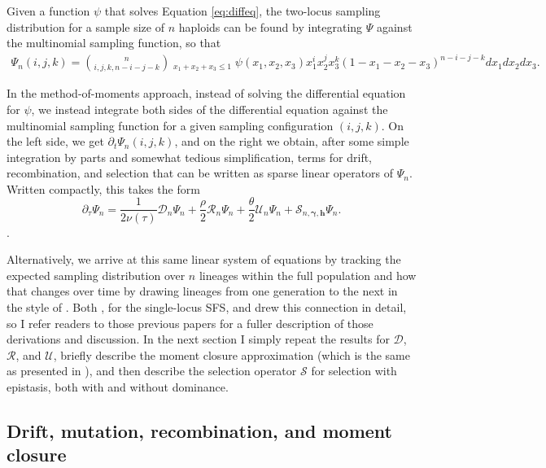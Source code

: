 \documentclass[]{article}
\begin{document}
Given a function \(\psi\) that solves Equation \ref{eq:diffeq}, the two-locus
sampling distribution for a sample size of \(n\) haploids can be found by
integrating \(\Psi\) against the multinomial sampling function, so that
\begin{align} \label{eq:multinomial}
\Psi_n(i, j, k) =
{n \choose{i, j, k, n-i-j-k}}
\mathop{\mathop{\int\int\int}_{x_1, x_2, x_3 \geq0}}_{x_1+x_2+x_3\leq1}
\psi(x_1, x_2, x_3) x_1^i x_2^j x_3^k (1-x_1-x_2-x_3)^{n-i-j-k}
dx_1 dx_2 dx_3.
\end{align}

In the method-of-moments approach, instead of solving the differential equation
for \(\psi\), we instead integrate both sides of the differential equation
against the multinomial sampling function for a given sampling configuration
\((i, j, k)\). On the left side, we get \(\partial_t \Psi_n(i, j, k)\), and on the
right we obtain, after some simple integration by parts and somewhat tedious
simplification, terms for drift, recombination, and selection that can be
written as sparse linear operators of \(\Psi_n\). Written compactly, this takes
the form
\begin{equation}
\partial_\tau \Psi_n =
\frac{1}{2\nu(\tau)}\mathcal{D}_{n}\Psi_n
+ \frac{\rho}{2}\mathcal{R}_{n}\Psi_n
+ \frac{\theta}{2}\mathcal{U}_{n}\Psi_n
+ \mathcal{S}_{n, \boldsymbol{\gamma}, \mathbf{h}}\Psi_n.
\end{equation}.

Alternatively, we arrive at this same linear system of equations by tracking
the expected sampling distribution over \(n\) lineages within the full population
and how that changes over time by drawing lineages from one generation to the
next in the style of \citet{Wright1931-wy}. Both \citet{Jouganous2017-pq}, for the
single-locus SFS, and \citet{Ragsdale2019-nt} drew this connection in detail, so I
refer readers to those previous papers for a fuller description of those
derivations and discussion. In the next section I simply repeat the results for
\(\mathcal{D}\), \(\mathcal{R}\), and \(\mathcal{U}\), briefly describe the moment
closure approximation (which is the same as presented in \citet{Ragsdale2019-nt}), and
then describe the selection operator \(\mathcal{S}\) for selection with
epistasis, both with and without dominance.

\subsection{Drift, mutation, recombination, and moment closure}
\end{document}
